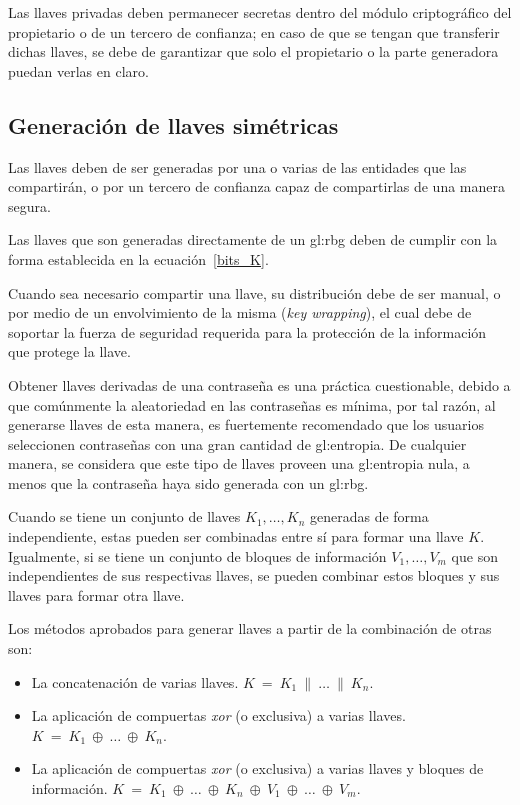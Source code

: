 Las llaves privadas deben permanecer secretas dentro del módulo criptográfico
del propietario o de un tercero de confianza; en caso de que se tengan que
transferir dichas llaves, se debe de garantizar que solo el propietario o la
parte generadora puedan verlas en claro.

\subsection{Generación de llaves simétricas}
Las llaves deben de ser generadas por una o varias de las entidades que
las compartirán, o por un tercero de confianza capaz de compartirlas de una
manera segura.

Las llaves que son generadas directamente de un \gls{gl:rbg} deben de cumplir
con la forma establecida en la ecuación~\ref{bits_K}.

Cuando sea necesario compartir una llave, su distribución debe de ser manual,
o por medio de un envolvimiento de la misma (\textit{key wrapping}), el cual
debe de soportar la fuerza de seguridad requerida para la protección de la
información que protege la llave.

Obtener llaves derivadas de una contraseña es una práctica cuestionable,
debido a que comúnmente la aleatoriedad en las contraseñas es mínima, por tal
razón, al generarse llaves de esta manera, es fuertemente recomendado que los
usuarios seleccionen contraseñas con una gran cantidad de \gls{gl:entropia}.
De cualquier manera, se considera que este tipo de llaves proveen una
\gls{gl:entropia} nula, a menos que la contraseña haya sido generada con
un \gls{gl:rbg}.

Cuando se tiene un conjunto de llaves $K_1, \dots, K_n$ generadas de forma
independiente, estas pueden ser combinadas entre sí para formar una llave $K$.
Igualmente, si se tiene un conjunto de bloques de información $V_1, \dots,
V_m$ que son independientes de sus respectivas llaves, se pueden combinar
estos bloques y sus llaves para formar otra llave.

Los métodos aprobados para generar llaves a partir de la combinación de
otras son:
\begin{itemize}

  \item La concatenación de varias llaves.
    $K\: =\: K_1\: \parallel\: \dots\: \parallel\: K_n$.

  \item La aplicación de compuertas \textit{xor} (o exclusiva) a varias llaves.
    $K\: =\: K_1\: \oplus\: \dots\: \oplus\: K_n$.

  \item La aplicación de compuertas \textit{xor} (o exclusiva) a varias llaves
    y bloques de información.
    $K\: =\: K_1\: \oplus\: \dots\: \oplus\: K_n\:
    \oplus\: V_1\: \oplus\: \dots\: \oplus\: V_m$.

\end{itemize}

